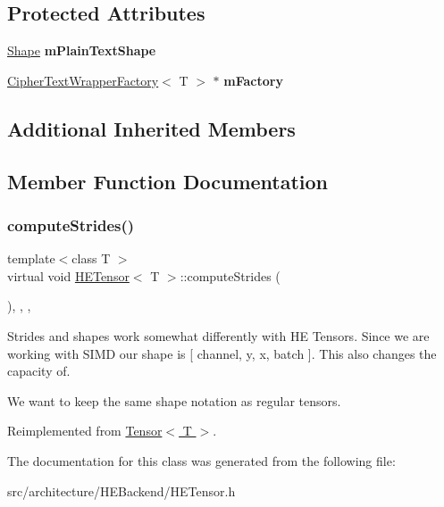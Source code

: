 \subsection*{Protected Attributes}
\begin{DoxyCompactItemize}
\item 
\mbox{\label{classHETensor_aa425107854263da0f5201441f28d06a4}} 
\hyperlink{classShape}{Shape} {\bfseries m\+Plain\+Text\+Shape}
\item 
\mbox{\label{classHETensor_afba83053883bb84881f313074600af40}} 
\hyperlink{classCipherTextWrapperFactory}{Cipher\+Text\+Wrapper\+Factory}$<$ T $>$ $\ast$ {\bfseries m\+Factory}
\end{DoxyCompactItemize}
\subsection*{Additional Inherited Members}


\subsection{Member Function Documentation}
\mbox{\label{classHETensor_ab0b9ca7b3826bc6c385514523e29de06}} 
\subsubsection{\texorpdfstring{compute\+Strides()}{computeStrides()}}
{\footnotesize\ttfamily template$<$class T $>$ \\
virtual void \hyperlink{classHETensor}{H\+E\+Tensor}$<$ T $>$\+::compute\+Strides (\begin{DoxyParamCaption}{ }\end{DoxyParamCaption})\hspace{0.3cm}{\ttfamily [inline]}, {\ttfamily [override]}, {\ttfamily [protected]}, {\ttfamily [virtual]}}

Strides and shapes work somewhat differently with HE Tensors. Since we are working with S\+I\+MD our shape is \mbox{[} channel, y, x, batch \mbox{]}. This also changes the capacity of.

We want to keep the same shape notation as regular tensors. 

Reimplemented from \hyperlink{classTensor_a22b23dcd3dbe86924e01d13476f44204}{Tensor$<$ T $>$}.



The documentation for this class was generated from the following file\+:\begin{DoxyCompactItemize}
\item 
src/architecture/\+H\+E\+Backend/H\+E\+Tensor.\+h\end{DoxyCompactItemize}
